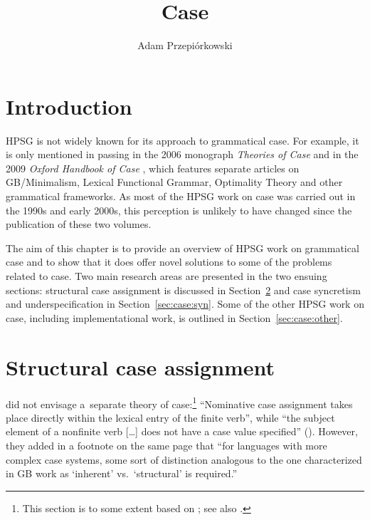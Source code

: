 \documentclass[output=paper,biblatex,babelshorthands,newtxmath,draftmode,colorlinks,citecolor=brown]{langscibook}
\author{Adam Przepiórkowski\orcid{0000-0002-4398-2636}\affiliation{University of Warsaw and Polish Academy of Sciences}}
\title{Case}
\begin{document}
\maketitle
\label{chap-case}

\section{Introduction}

HPSG is not widely known for its approach to grammatical case.  For example, it is only mentioned in passing in the 2006 monograph \emph{Theories of Case} \citep[225]{butt:06} and in the 2009 \emph{Oxford Handbook of Case} \citep[43]{mal:spe:09}, which features separate articles on GB/Minimalism, Lexical Functional Grammar, Optimality Theory and other grammatical frameworks.  As most of the HPSG work on case was carried out in the 1990s and early 2000s, this perception is unlikely to have changed since the publication of these two volumes.

The aim of this chapter is to provide an overview of HPSG work on grammatical case and to show that it does offer novel solutions to some of the problems related to case.  Two main research areas are presented in the two ensuing sections: structural case assignment is discussed in Section~\ref{sec:case:str} and case syncretism and underspecification in Section~\ref{sec:case:syn}.  Some of the other HPSG work on case, including implementational work, is outlined in Section~\ref{sec:case:other}.  %


\section{Structural case assignment}
\label{sec:case:str}

\citet{ps2} did not envisage a~separate theory of case:\footnote{This section is to some extent based on \citet[Section~3.4 and Chapter~4]{Prze99b}; see also \citet[Chapter~14]{MuellerLehrbuch3}.} “Nominative case assignment takes place directly within the lexical entry of the finite verb”, while “the subject  element of a nonfinite verb […] does not have a case value specified” ().  However, they added in a footnote on the same page that “for languages with more complex case systems, some sort of distinction analogous to the one characterized in GB work as `inherent' vs.~`structural' is required.”  
\end{document}

